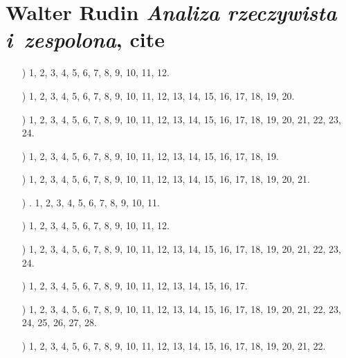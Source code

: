 \documentclass[a4paper,11pt]{article}
\numberwithin{equation}{section}
\begin{document}
\section{Walter Rudin \textit{Analiza rzeczywista
    i~zespolona}, cite{}}

\label{sec:Oznaczenia-i-konwencje}



\begin{itemize}

\item[\romannumeral1)] 1, 2, 3, 4, 5, 6, 7, 8, 9, 10, 11, 12.

\item[\romannumeral2)] 1, 2, 3, 4, 5, 6, 7, 8, 9, 10, 11, 12, 13, 14, 15, 16,
  17, 18, 19, 20.

\item[\romannumeral3)] 1, 2, 3, 4, 5, 6, 7, 8, 9, 10, 11, 12, 13, 14, 15,
  16, 17, 18, 19, 20, 21, 22, 23, 24.

\item[\romannumeral4)] 1, 2, 3, 4, 5, 6, 7, 8, 9, 10, 11, 12, 13, 14, 15,
  16, 17, 18, 19.

\item[\romannumeral5)] 1, 2, 3, 4, 5, 6, 7, 8, 9, 10, 11, 12, 13, 14, 15,
  16, 17, 18, 19, 20, 21.

\item[\romannumeral6)] . 1, 2, 3, 4, 5, 6, 7, 8, 9, 10, 11.

\item[\romannumeral7)] 1, 2, 3, 4, 5, 6, 7, 8, 9, 10, 11, 12.

\item[\romannumeral8)] 1, 2, 3, 4, 5, 6, 7, 8, 9, 10, 11, 12, 13, 14, 15,
  16, 17, 18, 19, 20, 21, 22, 23, 24.

\item[\romannumeral9)] 1, 2, 3, 4, 5, 6, 7, 8, 9, 10, 11, 12, 13, 14, 15,
  16, 17.

\item[\romannumeral10)] 1, 2, 3, 4, 5, 6, 7, 8, 9, 10, 11, 12, 13, 14, 15,
  16, 17, 18, 19, 20, 21, 22, 23, 24, 25, 26, 27, 28.

\item[\romannumeral11)] 1, 2, 3, 4, 5, 6, 7, 8, 9, 10, 11, 12, 13, 14, 15,
  16, 17, 18, 19, 20, 21, 22.

\end{itemize}
\end{document}
